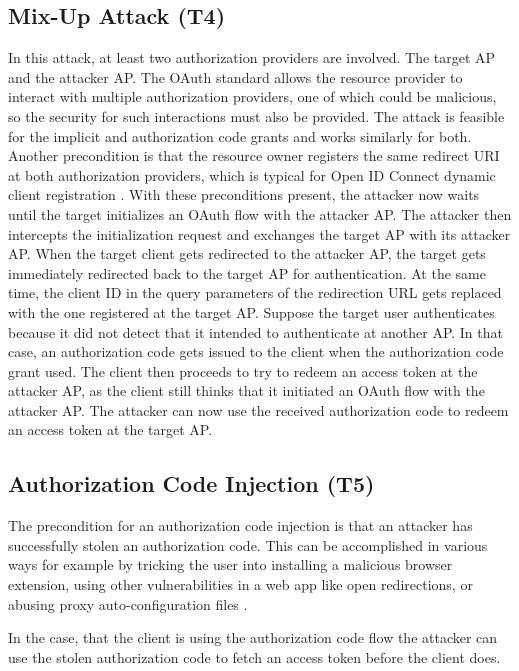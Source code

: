 \documentclass[
    fontsize=12pt,
    headings=small,
    parskip=half,           %
    bibliography=totoc,
    numbers=noenddot,       %
    open=any,               %
    ]{scrreprt}
\begin{document}
\subsection[Mix-Up Attack]{Mix-Up Attack (T4)}
\label{threat:T4}
In this attack, at least two authorization providers are involved. The target AP and the attacker AP. The OAuth standard allows the resource provider to interact with multiple authorization providers, one of which could be malicious, so the security for such interactions must also be provided. The attack is feasible for the implicit and authorization code grants and works similarly for both. Another precondition is that the resource owner registers the same redirect URI at both authorization providers, which is typical for Open ID Connect dynamic client registration \cite{hosseyni2023formal}. With these preconditions present, the attacker now waits until the target initializes an OAuth flow with the attacker AP. The attacker then intercepts the initialization request and exchanges the target AP with its attacker AP. When the target client gets redirected to the attacker AP, the target gets immediately redirected back to the target AP for authentication. At the same time, the client ID in the query parameters of the redirection URL gets replaced with the one registered at the target AP. Suppose the target user authenticates because it did not detect that it intended to authenticate at another AP. In that case, an authorization code gets issued to the client when the authorization code grant used. The client then proceeds to try to redeem an access token at the attacker AP, as the client still thinks that it initiated an OAuth flow with the attacker AP. The attacker can now use the received authorization code to redeem an access token at the target AP. \cite{fett2016comprehensive}

\subsection[Authorization Code Injection]{Authorization Code Injection (T5)}
\label{threat:T5} 
The precondition for an authorization code injection is that an attacker has
successfully stolen an authorization code. This can be accomplished in various
ways for example by tricking the user into installing a malicious browser
extension, using other vulnerabilities in a web app like open redirections, or
abusing proxy auto-configuration files \cite{philippaerts2022oauch}.

In the case, that the client is using the authorization code flow the attacker
can use the stolen authorization code to fetch an access token before the
client does.
\end{document}

